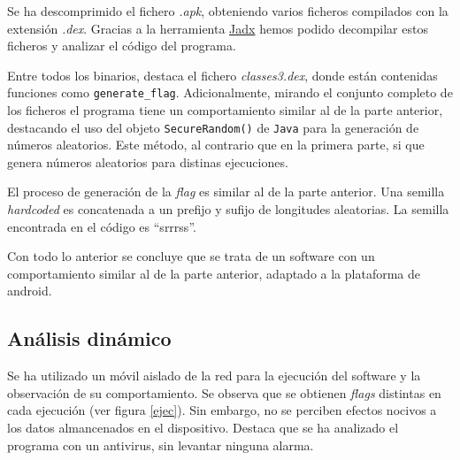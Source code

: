 \documentclass[]{article}
\begin{document}
Se ha descomprimido el fichero \textit{.apk}, obteniendo varios ficheros
compilados con la extensión \textit{.dex}. Gracias a la herramienta
\href{https://github.com/skylot/jadx}{Jadx} hemos podido decompilar estos
ficheros y analizar el código del programa.

Entre todos los binarios, destaca el fichero \textit{classes3.dex}, donde están
contenidas funciones como \texttt{generate\_flag}. Adicionalmente, mirando el
conjunto completo de los ficheros el programa tiene un comportamiento similar
al de la parte anterior, destacando el uso del objeto \texttt{SecureRandom()}
de \texttt{Java} para la generación de números aleatorios. Este método, al
contrario que en la primera parte, si que genera números aleatorios para
distinas ejecuciones.

El proceso de generación de la \textit{flag} es similar al de la parte
anterior. Una semilla \textit{hardcoded} es concatenada a un prefijo y sufijo
de longitudes aleatorias. La semilla encontrada en el código es ``srrrss''. 

Con todo lo anterior se concluye que se trata de un software con un
comportamiento similar al de la parte anterior, adaptado a la plataforma de
android.

\subsection{Análisis dinámico}
\label{subsec:analisis-dinámico-2}

Se ha utilizado un móvil aislado de la red para la ejecución del software y la
observación de su comportamiento. Se observa que se obtienen \textit{flags}
distintas en cada ejecución (ver figura \ref{ejec}). Sin embargo, no se perciben efectos nocivos a los
datos almancenados en el dispositivo. Destaca que se ha analizado el programa
con un antivirus, sin levantar ninguna alarma.
\end{document}
